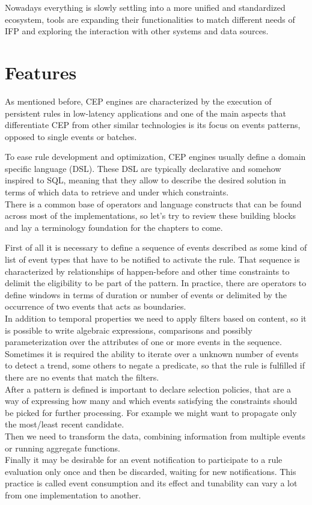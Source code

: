 Nowadays everything is slowly settling into a more unified and standardized ecosystem, tools are expanding their functionalities to match different needs of IFP and exploring the interaction with other systems and data sources.

\section{Features}
As mentioned before, CEP engines are characterized by the execution of persistent rules in low-latency applications and one of the main aspects that differentiate CEP from other similar technologies is its focus on events patterns, opposed to single events or batches.

To ease rule development and optimization, CEP engines usually define a domain specific language (DSL). These DSL are typically declarative and somehow inspired to SQL, meaning that they allow to describe the desired solution in terms of which data to retrieve and under which constraints.\\
There is a common base of operators and language constructs that can be found across most of the implementations, so let's try to review these building blocks and lay a terminology foundation for the chapters to come.

First of all it is necessary to define a sequence of events described as some kind of list of event types that have to be notified to activate the rule. That sequence is characterized by relationships of happen-before and other time constraints to delimit the eligibility to be part of the pattern. In practice, there are operators to define windows in terms of duration or number of events or delimited by the occurrence of two events that acts as boundaries.\\
In addition to temporal properties we need to apply filters based on content, so it is possible to write algebraic expressions, comparisons and possibly parameterization over the attributes of one or more events in the sequence.\\
Sometimes it is required the ability to iterate over a unknown number of events to detect a trend, some others to negate a predicate, so that the rule is fulfilled if there are no events that match the filters.\\
After a pattern is defined is important to declare selection policies, that are a way of expressing how many and which events satisfying the constraints should be picked for further processing. For example we might want to propagate only the most/least recent candidate.\\
Then we need to transform the data, combining information from multiple events or running aggregate functions.\\
Finally it may be desirable for an event notification to participate to a rule evaluation only once and then be discarded, waiting for new notifications. This practice is called event consumption and its effect and tunability can vary a lot from one implementation to another.

